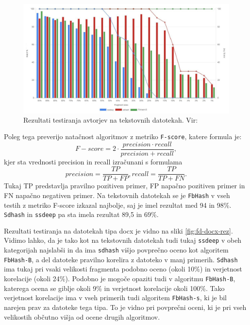 \documentclass{acm_proc_article-sp}
\begin{document}
\begin{figure}[htb]
\begin{center}
\includegraphics[width=1\columnwidth]{frag_det_text.png}
\end{center}
\caption{\small{Rezultati testiranja avtorjev na tekstovnih datotekah. Vir: \cite{fbhash}}}
\label{fig:fd-rez}
\end{figure}

Poleg tega preverijo natačnost algoritmov z metriko  \texttt{F-score}, katere formula je:
\begin{displaymath} F-score = 2\cdot\frac{precision\cdot recall}{precision + recall},\end{displaymath} 
kjer sta vrednosti precision in recall izračunani s formulama
\begin{displaymath} precision = \frac{TP}{TP + FP}, recall = \frac{TP}{TP+FN}.\end{displaymath} 
Tukaj TP predstavlja pravilno pozitiven primer, FP napačno pozitiven primer in FN napačno negativen primer. Na tekstovnih datotekah se je \texttt{FbHash} v vseh testih z metriko F-score izkazal najbolje, saj je imel rezultat med 94 in 98\%. \texttt{Sdhash} in \texttt{ssdeep} pa sta imela rezultat 89,5 in 69\%.

Rezultati testiranja na datotekah tipa docx je vidno na sliki \ref{fig:fd-docx-rez}. Vidimo lahko, da je tako kot na tekstovnih datotekah tudi tukaj \texttt{ssdeep} v obeh kategorijah najslabši in da ima  \texttt{sdhash} višjo povprečno oceno kot algoritem  \texttt{FbHash-B}, a del datoteke pravilno korelira z datoteko v manj primerih. \texttt{Sdhash} ima tukaj pri vsaki velikosti fragmenta podobno oceno (okoli 10\%) in verjetnost korelacije (okoli 24\%). Podobno je mogoče opaziti tudi v algoritmu \texttt{FbHash-B}, katerega ocena se giblje okoli 9\% in verjetnost korelacije okoli 100\%. Tako verjetnost korelacije ima v vseh primerih tudi algoritem \texttt{FbHash-s}, ki je bil narejen prav za datoteke tega tipa. To je vidno pri povprečni oceni, ki je pri vseh velikostih občutno višja od ocene drugih algoritmov.
\end{document}
